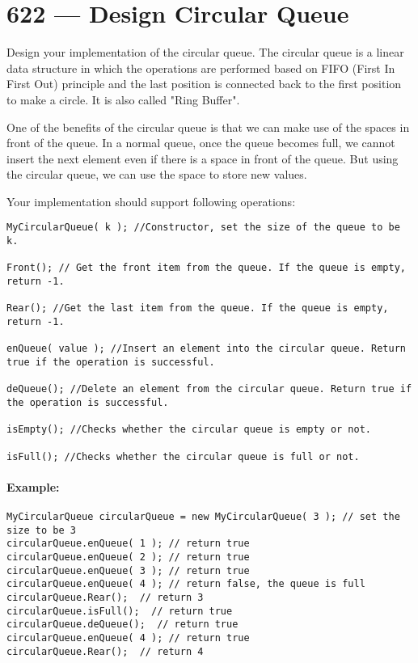 \section{622 --- Design Circular Queue}
Design your implementation of the circular queue. The circular queue is a linear data structure in which the operations are performed based on FIFO (First In First Out) principle and the last position is connected back to the first position to make a circle. It is also called "Ring Buffer".

One of the benefits of the circular queue is that we can make use of the spaces in front of the queue. In a normal queue, once the queue becomes full, we cannot insert the next element even if there is a space in front of the queue. But using the circular queue, we can use the space to store new values.

Your implementation should support following operations:

\begin{lstlisting}[style=customc]
MyCircularQueue( k ); //Constructor, set the size of the queue to be k.

Front(); // Get the front item from the queue. If the queue is empty, return -1.

Rear(); //Get the last item from the queue. If the queue is empty, return -1.

enQueue( value ); //Insert an element into the circular queue. Return true if the operation is successful.

deQueue(); //Delete an element from the circular queue. Return true if the operation is successful.

isEmpty(); //Checks whether the circular queue is empty or not.

isFull(); //Checks whether the circular queue is full or not.
\end{lstlisting}

 

\paragraph{Example:}

\begin{lstlisting}[style=customc]
MyCircularQueue circularQueue = new MyCircularQueue( 3 ); // set the size to be 3
circularQueue.enQueue( 1 ); // return true
circularQueue.enQueue( 2 ); // return true
circularQueue.enQueue( 3 ); // return true
circularQueue.enQueue( 4 ); // return false, the queue is full
circularQueue.Rear();  // return 3
circularQueue.isFull();  // return true
circularQueue.deQueue();  // return true
circularQueue.enQueue( 4 ); // return true
circularQueue.Rear();  // return 4
\end{lstlisting}

